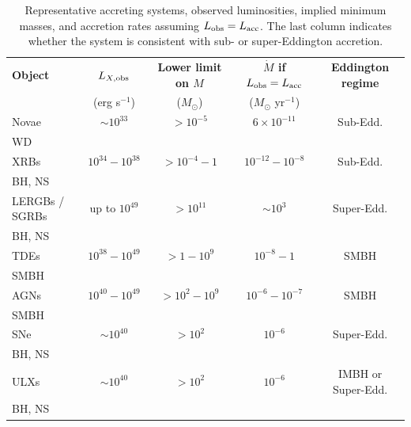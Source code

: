 \begin{table}[h]
    \small
\centering
\renewcommand{\arraystretch}{1.2}
\begin{tabular}{lcccc}
\hline
\textbf{Object} & \textbf{$L_{X,\rm obs}$} & \textbf{Lower limit on $M$} & \textbf{$\dot{M}$ if $L_{\rm obs}=L_{\rm acc}$} & \textbf{Eddington regime} \\
                & (erg s$^{-1}$) & ($M_\odot$) & ($M_\odot$ yr$^{-1}$) &  \\
\hline
Novae           & $\sim 10^{33}$ & $> 10^{-5}$ & $6 \times 10^{-11}$ & Sub-Edd.\\
WD              &                &             &                      &             \\
\hline
XRBs            & $10^{34} - 10^{38}$ & $> 10^{-4} - 1$ & $10^{-12} - 10^{-8}$ & Sub-Edd.\\
BH, NS          &                     &                 &                      &             \\
\hline
LERGBs / SGRBs  & up to $10^{49}$ & $> 10^{11}$ & $\sim 10^{3}$ & Super-Edd. \\
BH, NS          &                 &             &               &             \\
\hline
TDEs            & $10^{38} - 10^{49}$ & $> 1 - 10^{9}$ & $10^{-8} - 1$ & SMBH\\
SMBH            &                     &                 &               &        \\
\hline
AGNs            & $10^{40} - 10^{49}$ & $> 10^{2} - 10^{9}$ & $10^{-6} - 10^{-7}$ & SMBH\\
SMBH            &                     &                     &                      &         \\
\hline
SNe             & $\sim 10^{40}$ & $> 10^{2}$ & $10^{-6}$ & Super-Edd. \\
BH, NS          &                 &            &           &                           \\
\hline
ULXs            & $\sim 10^{40}$ & $> 10^{2}$ & $10^{-6}$ & IMBH or Super-Edd. \\
BH, NS          &                 &            &           &                           \\
\hline
\end{tabular}
\caption{Representative accreting systems, observed luminosities, implied minimum masses, and accretion rates assuming $L_{\rm obs}=L_{\rm acc}$. The last column indicates whether the system is consistent with sub- or super-Eddington accretion.}
\label{tab:accretion-systems}
\end{table}

